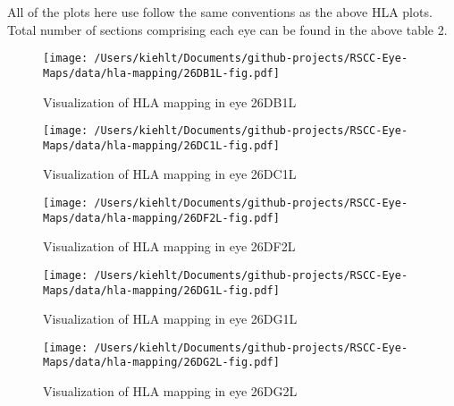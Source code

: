 \documentclass{article}
\begin{document}
All of the plots here use follow the same conventions as the above HLA plots. Total number of sections comprising each eye can be found in the above table 2.

\begin{center}
\begin{figure}
\texttt{[image: /Users/kiehlt/Documents/github-projects/RSCC-Eye-Maps/data/hla-mapping/26DB1L-fig.pdf]}
\caption{Visualization of HLA mapping in eye 26DB1L}
\label{fig:26DB1L}
\end{figure}

\end{center}
\begin{center}
\begin{figure}
\texttt{[image: /Users/kiehlt/Documents/github-projects/RSCC-Eye-Maps/data/hla-mapping/26DC1L-fig.pdf]}
\caption{Visualization of HLA mapping in eye 26DC1L}
\label{fig:26DC1L}
\end{figure}

\end{center}
\begin{center}
\begin{figure}
\texttt{[image: /Users/kiehlt/Documents/github-projects/RSCC-Eye-Maps/data/hla-mapping/26DF2L-fig.pdf]}
\caption{Visualization of HLA mapping in eye 26DF2L}
\label{fig:26DF2L}
\end{figure}

\end{center}
\begin{center}
\begin{figure}
\texttt{[image: /Users/kiehlt/Documents/github-projects/RSCC-Eye-Maps/data/hla-mapping/26DG1L-fig.pdf]}
\caption{Visualization of HLA mapping in eye 26DG1L}
\label{fig:26DG1L}
\end{figure}

\end{center}
\begin{center}
\begin{figure}
\texttt{[image: /Users/kiehlt/Documents/github-projects/RSCC-Eye-Maps/data/hla-mapping/26DG2L-fig.pdf]}
\caption{Visualization of HLA mapping in eye 26DG2L}
\label{fig:26DG2L}
\end{figure}

\end{center}
\end{document}
